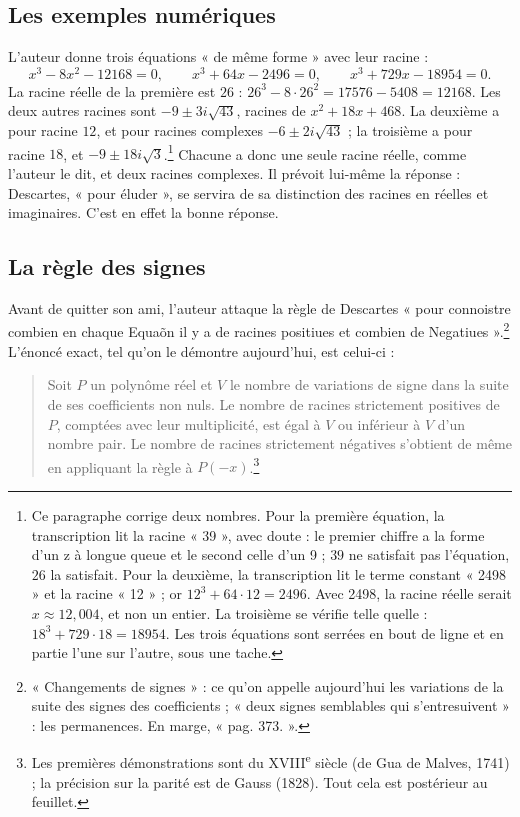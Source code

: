 \documentclass[11pt,a4paper]{article}
\begin{document}
\subsection*{Les exemples numériques}

L'auteur donne trois équations « de même forme » avec leur racine :
\[
x^3-8x^2-12168=0,\qquad x^3+64x-2496=0,\qquad x^3+729x-18954=0 .
\]
La racine réelle de la première est \(26\) : \(26^3-8\cdot 26^2=17576-5408=12168\).
Les deux autres racines sont \(-9\pm 3i\sqrt{43}\), racines de
\(x^2+18x+468\). La deuxième a pour racine \(12\), et pour racines complexes
\(-6\pm 2i\sqrt{43}\) ; la troisième a pour racine \(18\), et
\(-9\pm 18i\sqrt3\).\footnote{Ce paragraphe corrige deux nombres. Pour la
première équation, la transcription lit la racine « 39 », avec doute : le
premier chiffre a la forme d'un z à longue queue et le second celle d'un 9 ;
\(39\) ne satisfait pas l'équation, \(26\) la satisfait. Pour la deuxième, la
transcription lit le terme constant « 2498 » et la racine « 12 » ; or
\(12^3+64\cdot12=2496\). Avec 2498, la racine réelle serait
\(x\approx 12{,}004\), et non un entier. La troisième se vérifie telle
quelle : \(18^3+729\cdot18=18954\). Les trois équations sont serrées en bout
de ligne et en partie l'une sur l'autre, sous une tache.} Chacune a donc une
seule racine réelle, comme l'auteur le dit, et deux racines complexes. Il
prévoit lui-même la réponse : Descartes, « pour éluder », se servira de sa
distinction des racines en réelles et imaginaires. C'est en effet la bonne
réponse.

\subsection*{La règle des signes}

Avant de quitter son ami, l'auteur attaque la règle de Descartes « pour
connoistre combien en chaque Equaõn il y a de racines positiues et combien de
Negatiues ».\footnote{« Changements de signes » : ce qu'on appelle aujourd'hui
les variations de la suite des signes des coefficients ; « deux signes
semblables qui s'entresuivent » : les permanences. En marge, « pag. 373. ».}
L'énoncé exact, tel qu'on le démontre aujourd'hui, est celui-ci :

\begin{quote}
Soit \(P\) un polynôme réel et \(V\) le nombre de variations de signe dans la
suite de ses coefficients non nuls. Le nombre de racines strictement positives
de \(P\), comptées avec leur multiplicité, est égal à \(V\) ou inférieur à \(V\)
d'un nombre pair. Le nombre de racines strictement négatives s'obtient de même
en appliquant la règle à \(P(-x)\).\footnote{Les premières démonstrations sont
du XVIII\textsuperscript{e} siècle (de Gua de Malves, 1741) ; la précision sur
la parité est de Gauss (1828). Tout cela est postérieur au feuillet.}
\end{quote}
\end{document}
